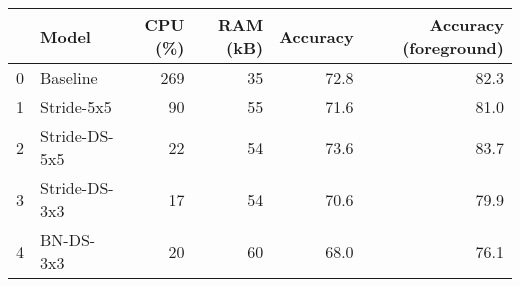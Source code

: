 \begin{tabular}{llrrrr}
\toprule
{} &          Model &  CPU (\%) &  RAM (kB) &  Accuracy &  Accuracy (foreground) \\
\midrule
0 &       Baseline &      269 &        35 &      72.8 &                   82.3 \\
1 &     Stride-5x5 &       90 &        55 &      71.6 &                   81.0 \\
2 &  Stride-DS-5x5 &       22 &        54 &      73.6 &                   83.7 \\
3 &  Stride-DS-3x3 &       17 &        54 &      70.6 &                   79.9 \\
4 &      BN-DS-3x3 &       20 &        60 &      68.0 &                   76.1 \\
\bottomrule
\end{tabular}
